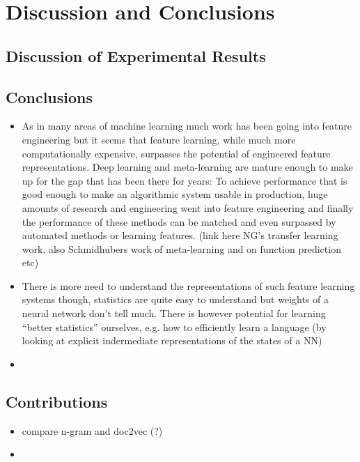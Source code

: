 
\clearpage
\section{Discussion and Conclusions}

\subsection{Discussion of Experimental Results}

\subsection{Conclusions}
\label{subs:conclusions}

\begin{itemize}
  \item As in many areas of machine learning much work has been going into feature engineering but it seems that feature learning, while much more computationally expensive, surpasses the potential of engineered feature representations. Deep learning and meta-learning are mature enough to make up for the gap that has been there for years: To achieve performance that is good enough to make an algorithmic system usable in production, huge amounts of research and engineering went into feature engineering and finally the performance of these methods can be matched and even surpassed by automated methods or learning features. (link here NG's transfer learning work, also Schmidhubers work of meta-learning and on function prediction etc)
  \item There is more need to understand the representations of such feature learning systems though, statistics are quite easy to understand but weights of a neural network don't tell much. There is however potential for learning ``better statistics'' ourselves, e.g. how to efficiently learn a language (by looking at explicit indermediate representations of the states of a NN)
  \item
\end{itemize}


\subsection{Contributions}
\label{sub:contributions}

\begin{itemize}
  \item compare n-gram and doc2vec (?)
  \item
\end{itemize}

